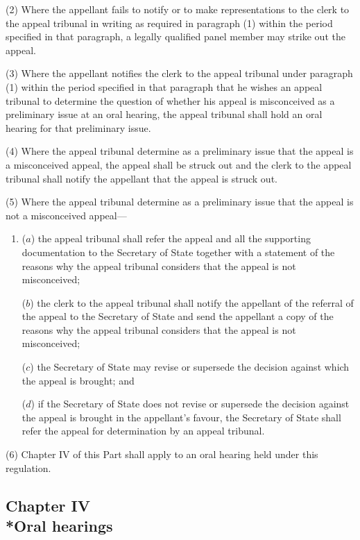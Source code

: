 \documentclass[12pt,a4paper]{article}
\begin{document}
(2) Where the appellant fails to notify or to make representations to the clerk to the appeal tribunal in writing as required in paragraph (1) within the period specified in that paragraph, a legally qualified panel member may strike out the appeal.

(3) Where the appellant notifies the clerk to the appeal tribunal under paragraph (1) within the period specified in that paragraph that he wishes an appeal tribunal to determine the question of whether his appeal is misconceived as a preliminary issue at an oral hearing, the appeal tribunal shall hold an oral hearing for that preliminary issue.

(4) Where the appeal tribunal determine as a preliminary issue that the appeal is a misconceived appeal, the appeal shall be struck out and the clerk to the appeal tribunal shall notify the appellant that the appeal is struck out.

(5) Where the appeal tribunal determine as a preliminary issue that the appeal is not a misconceived appeal—
\begin{enumerate}\item[]
($a$) the appeal tribunal shall refer the appeal and all the supporting documentation to the Secretary of State together with a statement of the reasons why the appeal tribunal considers that the appeal is not misconceived;

($b$) the clerk to the appeal tribunal shall notify the appellant of the referral of the appeal to the Secretary of State and send the appellant a copy of the reasons why the appeal tribunal considers that the appeal is not misconceived;

($c$) the Secretary of State may revise or supersede the decision against which the appeal is brought; and

($d$) if the Secretary of State does not revise or supersede the decision against the appeal is brought in the appellant’s favour, the Secretary of State shall refer the appeal for determination by an appeal tribunal.
\end{enumerate}

(6) Chapter IV of this Part shall apply to an oral hearing held under this regulation.

\subsection[Chapter IV --- Oral hearings]{Chapter IV\\*Oral hearings}
\end{document}
